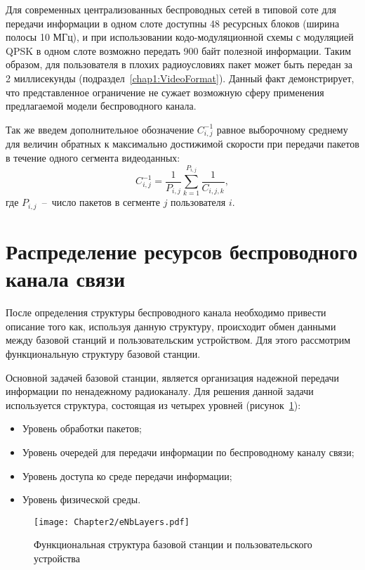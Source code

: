 Для современных централизованных беспроводных сетей в типовой соте для передачи информации в одном слоте доступны 48 ресурсных блоков (ширина полосы 10 МГц), и при использовании кодо-модуляционной схемы с модуляцией QPSK в одном слоте возможно передать 900 байт полезной информации. Таким образом, для пользователя в плохих радиоусловиях пакет может быть передан за 2 миллисекунды (подраздел~\ref{chap1:VideoFormat}). Данный факт демонстрирует, что представленное ограничение не сужает возможную сферу применения предлагаемой модели беспроводного канала.

Так же введем дополнительное обозначение $C_{i,j}^{-1}$ равное выборочному среднему для величин обратных к максимально достижимой скорости при передачи пакетов в течение одного сегмента видеоданных:
\begin{equation}
\nonumber
C_{i,j}^{-1} = \frac{1}{P_{i,j}}\sum\limits_{k=1}^{P_{i,j}} \frac{1}{C_{i,j,k}},
\label{eq:ChannelConst_v1}
\end{equation}
где $P_{i,j}$~--~число пакетов в сегменте $j$ пользователя $i$.

\section{Распределение ресурсов беспроводного канала связи}
\label{chap2:Scheduler}

После определения структуры беспроводного канала необходимо привести описание того как, используя данную структуру, происходит обмен данными между базовой станций и пользовательским устройством. Для этого рассмотрим функциональную структуру базовой станции.

Основной задачей базовой станции, является организация надежной передачи информации по ненадежному радиоканалу. Для решения данной задачи используется структура, состоящая из четырех уровней (рисунок~\ref{fig:eNbLayers}):
\begin{itemize}
	\item Уровень обработки пакетов;
	\item Уровень очередей для передачи информации по беспроводному каналу связи;
	\item Уровень доступа ко среде передачи информации;
	\item Уровень физической среды.
\end{itemize}

\begin{figure}[htbp]
\begin{center}
\texttt{[image: Chapter2/eNbLayers.pdf]}
\caption{Функциональная структура базовой станции и пользовательского устройства}
\label{fig:eNbLayers}
\end{center}
\end{figure}

